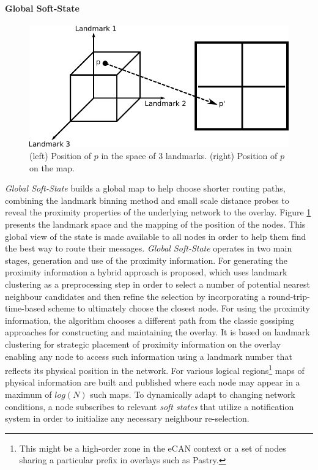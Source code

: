 \paragraph*{\bf Global Soft-State}

\begin{figure}
\centering
  \includegraphics[scale=0.8]{img/algorithms/global_softstate}
\caption{(left) Position of $p$ in the space of $3$ landmarks. (right) Position
of $p$ on the map.}
\label{fig:global_softstate}
\end{figure}

\textit{Global Soft-State} \cite{xu_globstate_2003} builds a global map to help
choose shorter routing paths, combining the landmark binning method and small
scale distance probes to reveal the proximity properties of the underlying
network to the overlay. Figure \ref{fig:global_softstate} presents the landmark
space and the mapping of the position of the nodes. This global view of the
state is made available to all nodes in order to help them find the best way to
route their messages. \textit{Global Soft-State} operates in two main stages,
generation and use of the proximity information. For generating the proximity
information a hybrid approach is proposed, which uses landmark clustering as a
preprocessing step in order to select a number of potential nearest neighbour
candidates and then refine the selection by incorporating a
round-trip-time-based scheme to ultimately choose the closest node. For using
the proximity information, the algorithm chooses a different path from the
classic gossiping approaches for constructing and maintaining the overlay. It is
based on landmark clustering for strategic placement of proximity information on
the overlay enabling any node to access such information using a landmark number
that reflects its physical position in the network. For various logical
regions\footnote{This might be a high-order zone in the eCAN\cite{xu_ecan_2002}
context or a set of nodes sharing a particular prefix in overlays such as
Pastry.} maps of physical information are built and published where each node
may appear in a maximum of $log\left( N \right)$ such maps. To dynamically adapt
to changing network conditions, a node subscribes to relevant \emph{soft states}
that utilize a notification system in order to initialize any necessary
neighbour re-selection.

